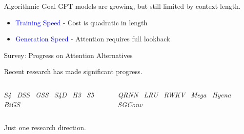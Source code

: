 \begin{frame}{Algorithmic Goal}
    GPT models are growing, but still limited by context length.
    \vspace{1cm}
    
    \begin{itemize}
        \item \textcolor{blue}{Training Speed} - Cost is quadratic in length
        \item \textcolor{blue}{Generation Speed} - Attention requires full lookback
    \end{itemize}
\end{frame}




\begin{frame}{Survey: Progress on Attention Alternatives}
    \begin{center}
        Recent research has made significant progress.
    \end{center}

    \begin{columns}
    \begin{column}{0.4\textwidth}
    \textit{S4}~\cite{gu2022parameterization}
    \textit{DSS}~\cite{gupta2022diagonal}
    \textit{GSS}~\cite{mehta2022long}
    \textit{S4D}~\cite{Gu2022-jz} 
    \textit{H3}~\cite{dao2022hungry}
    \textit{S5}~\cite{smith2022simplified}
    \textit{BiGS}~\cite{Wang2022-un}
    \end{column}
    \begin{column}{0.4\textwidth}      
    \textit{QRNN}~\cite{mccann2017learned}
    \textit{LRU}~\cite{Orvieto2023-an}
    \textit{RWKV}~\cite{Peng2023-yp}
    \textit{Mega}~\cite{ma2022mega}
    \textit{Hyena}~\cite{Poli2023-ag}
    \textit{SGConv}~\cite{Li2022-pn}
    \end{column}
    \end{columns}
    \pause

    
    \begin{center}
         Just one research direction.
        
    \end{center}


\end{frame}



